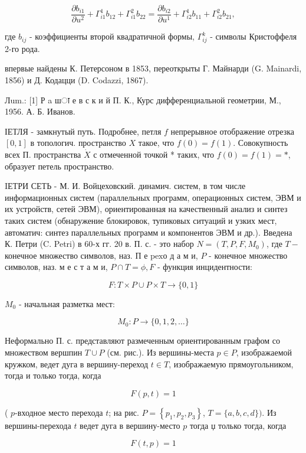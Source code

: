 \documentclass[10pt]{article}
\begin{document}
\[
\frac{\partial b_{i 1}}{\partial u^{2}}+\Gamma_{i 1}^{1} b_{12}+\Gamma_{i 1}^{2} b_{22}=\frac{\partial b_{i 2}}{\partial u^{1}}+\Gamma_{i 2}^{1} b_{11}+\Gamma_{i 2}^{2} b_{21},
\]

где $b_{i j}$ - коэффициенты второй квадратичной формы, $\Gamma_{i j}^{k}$ - символы Кристоффеля 2-го рода.

впервые найдены К. Петерсоном в 1853, переоткрыты Г. Майнарди (G. Mainardi, 1856) и Д. Кодацци (D. Codazzi, 1867).

Лum.: [1] Р a шा е в с к и й П. К., Курс дифференциальной геометрии, М., 1956. А. Б. Иванов.

ІЕТЛЯ - замкнутый путь. Подробнее, петля $f$ непрерывное отображение отрезка $[0,1]$ в топологич. пространство $X$ такое, что $f(0)=f(1)$. Совокупность всех П. пространства $\dot{X}$ с отмеченной точкой * таких, что $f(0)=f(1)=*$, образует петель пространство.

IЕТРИ СЕТЬ - М. И. Войцеховский. динамич. систем, в том числе информационных систем (параллельных программ, операционных систем, ЭВМ и их устройств, сетей ЭВМ), ориентированная на качественный анализ и синтез таких систем (обнаружение блокировок, тупиковых ситуаций и узких мест, автоматич: синтез параллельных программ и компонентов ЭВМ и др.). Введена К. Петри (C. Petri) в 60-х гг. 20 в. П. с. - это набор $N=\left(T, P, F, M_{0}\right)$, где $T-$ конечное множество символов, наз. П е $\mathrm{p} \mathrm{e} \mathrm{x} о$ д а м и, $P$ - конечное множество символов, наз. м е с т а м и, $P \cap T=\phi, F$ - функция инцидентности:

\[
F: T \times P \cup P \times T \longrightarrow\{0,1\}
\]

$M_{0}$ - начальная разметка мест:

\[
M_{0}: P \longrightarrow\{0,1,2, \ldots\}
\]

Неформально П. с. представляют размеченным ориентированным графом со множеством вершпин $T \cup P$ (см. рис.). Из вершины-места $p \in P$, изображаемой кружком, ведет дуга в вершину-переход $t \in T$, изображаемую прямоугольником, тогда и только тогда, когда

\[
F(p, t)=1
\]

( $p$-входное место перехода $t$; на рис. $P=\left\{p_{1}, p_{2}, p_{3}\right\}$, $T=\{a, b, c, d\})$. Из вершины-перехода $t$ ведет дуга в вершину-место $p$ тогда џ только тогда, когда

\[
F(t, p)=1
\]
\end{document}
